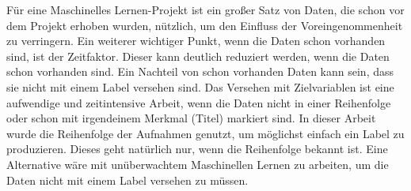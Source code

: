 Für eine Maschinelles Lernen-Projekt ist ein großer Satz von Daten, die schon vor dem Projekt erhoben wurden, nützlich,  um den Einfluss der Voreingenommenheit zu verringern.  Ein weiterer wichtiger Punkt, wenn die Daten schon vorhanden sind, ist der Zeitfaktor.  Dieser kann deutlich reduziert werden, wenn die Daten schon vorhanden sind.  Ein Nachteil von schon vorhanden Daten kann sein,  dass sie nicht mit einem Label versehen sind.  Das Versehen mit Zielvariablen ist eine aufwendige und zeitintensive Arbeit, wenn die Daten nicht in einer Reihenfolge oder schon mit irgendeinem Merkmal (Titel) markiert sind. In dieser Arbeit wurde die Reihenfolge der Aufnahmen genutzt,  um möglichst einfach ein Label zu produzieren. Dieses geht natürlich nur,  wenn die Reihenfolge bekannt ist.  Eine Alternative wäre mit unüberwachtem Maschinellen Lernen zu arbeiten,  um die Daten nicht mit einem Label versehen zu müssen.\\
